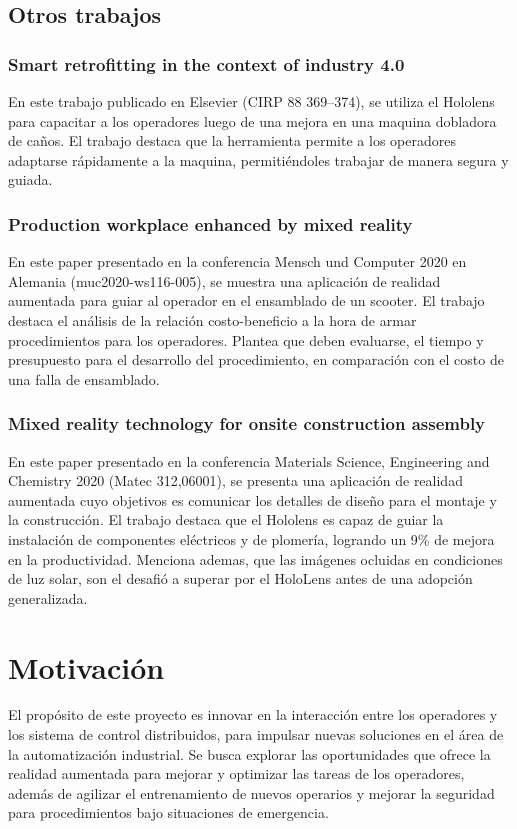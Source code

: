 \subsection{Otros trabajos}

\subsubsection{Smart retrofitting in the context of industry 4.0}
En este trabajo publicado en Elsevier (CIRP 88 369–374), se utiliza el Hololens para capacitar a los operadores luego de una mejora en una maquina dobladora de caños. El trabajo destaca que la herramienta permite a los operadores adaptarse rápidamente a la maquina, permitiéndoles trabajar de manera segura y guiada.

\subsubsection{Production workplace enhanced by mixed reality}
En este paper presentado en la conferencia Mensch und Computer 2020 en Alemania (muc2020-ws116-005), se muestra una aplicación de realidad aumentada para guiar al operador en el ensamblado de un scooter. El trabajo destaca el análisis de la relación costo-beneficio a la hora de armar procedimientos para los operadores. Plantea que deben evaluarse, el tiempo y presupuesto para el desarrollo del procedimiento, en comparación con el costo de una falla de ensamblado.

\subsubsection{Mixed reality technology for onsite construction assembly}
En este paper presentado en la conferencia Materials Science, Engineering and Chemistry 2020 (Matec 312,06001), se presenta una aplicación de realidad aumentada cuyo objetivos es comunicar los detalles de diseño para el montaje y la construcción. El trabajo destaca que el Hololens es capaz de guiar la instalación de componentes eléctricos y de plomería, logrando un 9\% de mejora en la productividad. Menciona ademas, que las imágenes ocluidas en condiciones de luz solar, son el desafió a superar por el HoloLens antes de una adopción generalizada.

\section{Motivación}
El propósito de este proyecto es innovar en la interacción entre los operadores y los sistema de control distribuidos, para impulsar nuevas soluciones en el área de la automatización industrial. Se busca explorar las oportunidades que ofrece la realidad aumentada para mejorar y optimizar las tareas de los operadores, además de agilizar el entrenamiento de nuevos operarios y mejorar la seguridad para procedimientos bajo situaciones de emergencia.

